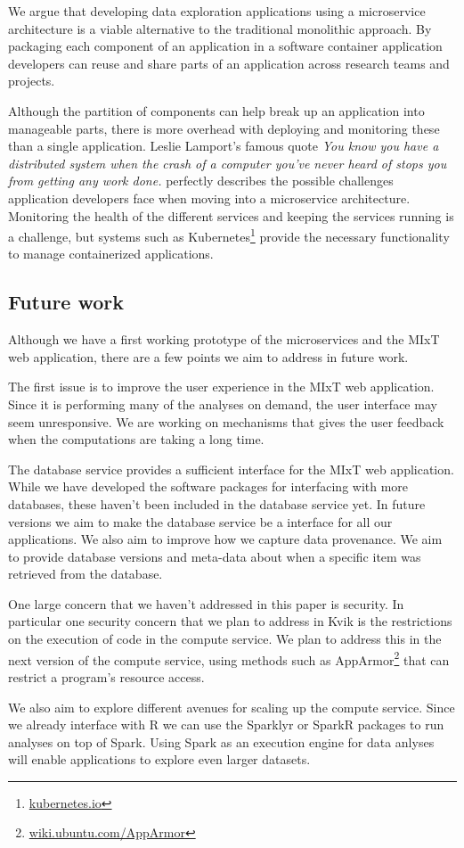 We argue that developing data exploration applications using a microservice
architecture is a viable alternative to the traditional monolithic approach.
By packaging each component of an application in a software container
application developers can reuse and share parts of an application across
research teams and projects. 

Although the partition of components can help break up an application into
manageable parts, there is more overhead with deploying and monitoring these
than a single application. Leslie Lamport's famous quote \emph{You know you have
a distributed system when the crash of a computer you’ve never heard of stops
you from getting any work done.} perfectly describes the possible challenges
application developers face when moving into a microservice architecture.
Monitoring the health of the different services and keeping the services running
is a challenge, but systems such as Kubernetes\footnote{\url{kubernetes.io}}
provide the necessary functionality to manage containerized applications. 

\subsection*{Future work} 
Although we have a first working prototype of the microservices and the MIxT web
application, there are a few points we aim to address in future work.

The first issue is to improve the user experience in the MIxT web application.
Since it is performing many of the analyses on demand, the user interface may
seem unresponsive. We are working on mechanisms that gives the user feedback
when the computations are taking a long time. 

The database service provides a sufficient interface for the
MIxT web application. While we have developed the software packages for
interfacing with more databases, these haven't been included in the database
service yet. In future versions we aim to make the database service be a
interface for all our applications. 
We also aim to improve how we capture data provenance. We aim to provide
database versions and meta-data about when a specific item was retrieved from
the database.


One large concern that we haven't addressed in this paper is security. In
particular one security concern that we plan to address in Kvik is the
restrictions on the execution of code in the compute service. We plan to address
this in the next version of the compute service, using methods such as
AppArmor\footnote{\url{wiki.ubuntu.com/AppArmor}} that can restrict a program's
resource access. 

We also aim to explore different avenues for scaling up the compute service.
Since we already interface with R we can use the Sparklyr or SparkR packages
to run analyses on top of Spark. Using Spark as an execution engine for data
anlyses will enable applications to explore even larger datasets. 
